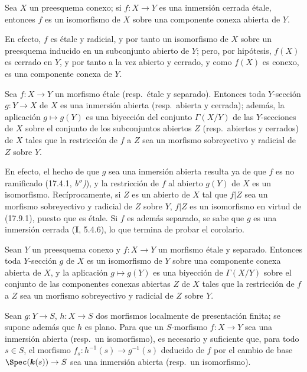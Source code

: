 \begin{corollary}[17.9.2]
\label{IV.17.9.2}
Sea $X$ un preesquema conexo; si $f:X\to Y$ es una inmersión cerrada étale, entonces $f$ es un isomorfismo de $X$ sobre una componente conexa abierta de $Y$.
\end{corollary}

En efecto, $f$ es étale y radicial, y por tanto un isomorfismo de $X$ sobre un preesquema inducido en un subconjunto abierto de $Y$; pero, por hipótesis, $f(X)$ es cerrado en $Y$, y por tanto a la vez abierto y cerrado, y como $f(X)$ es conexo, es una componente conexa de $Y$.

\begin{corollary}[17.9.3]
\label{IV.17.9.3}
Sea $f:X\to Y$ un morfismo étale \textup{(resp.}\ étale y separado\textup{)}. Entonces toda $Y$-sección $g:Y\to X$ de $X$ es una inmersión abierta \textup{(resp.}\ abierta y cerrada\textup{)}; además, la aplicación $g\mapsto g(Y)$ es una biyección del conjunto $\Gamma(X/Y)$ de las $Y$-secciones de $X$ sobre el conjunto de los subconjuntos abiertos $Z$ \textup{(resp.}\ abiertos y cerrados\textup{)} de $X$ tales que la restricción de $f$ a $Z$ sea un morfismo sobreyectivo y radicial de $Z$ sobre $Y$.
\end{corollary}

En efecto, el hecho de que $g$ sea una inmersión abierta resulta ya de que $f$ es no ramificado (17.4.1, \emph{b$''$)}), y la restricción de $f$ al abierto $g(Y)$ de $X$ es un isomorfismo. Recíprocamente, si $Z$ es un abierto de $X$ tal que $f|Z$ sea un morfismo sobreyectivo y radicial de $Z$ sobre $Y$, $f|Z$ es un isomorfismo en virtud de (17.9.1), puesto que es étale. Si $f$ es además separado, se sabe que $g$ es una inmersión cerrada (\textbf I, 5.4.6), lo que termina de probar el corolario.

\begin{corollary}[17.9.4]
\label{IV.17.9.4}
Sean $Y$ un preesquema conexo y $f:X\to Y$ un morfismo étale y separado. Entonces toda $Y$-sección $g$ de $X$ es un isomorfismo de $Y$ sobre una componente conexa abierta de $X$, y la aplicación $g\mapsto g(Y)$ es una biyección de $\Gamma(X/Y)$ sobre el conjunto de las componentes conexas abiertas $Z$ de $X$ tales que la restricción de $f$ a $Z$ sea un morfismo sobreyectivo y radicial de $Z$ sobre $Y$.
\end{corollary}

\begin{corollary}[17.9.5]
\label{IV.17.9.5}
Sean $g:Y\to S$, $h:X\to S$ dos morfismos localmente de presentación finita; se supone además que $h$ es \textup{plano}. Para que un $S$-morfismo $f:X\to Y$ sea una inmersión abierta \textup{(resp.}\ un isomorfismo\textup{)}, es necesario y suficiente que, para todo $s\in S$, el morfismo $f_s:h^{-1}(s)\to g^{-1}(s)$ deducido de $f$ por el cambio de base $\Spec(\boldsymbol k(s))\to S$ sea una inmersión abierta \textup{(resp.}\ un isomorfismo\textup{)}.
\end{corollary}

